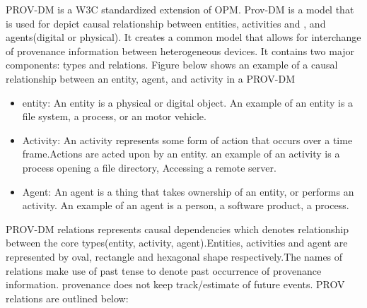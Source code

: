 PROV-DM is a W3C standardized extension of OPM. Prov-DM is a model that is used for depict causal relationship between entities, activities and , and agents(digital or physical).  It creates a common model that allows for interchange of provenance information between heterogeneous devices. It contains two major components: types and relations. Figure below shows an example of a causal relationship between an entity, agent, and activity in a PROV-DM

%
%
\begin{itemize}

\item entity: An entity is a physical or digital object. An example of an entity is a file system, a process, or an motor vehicle.

\item Activity: An activity represents some form of action that occurs over a time frame.Actions are acted upon by an entity. an example of an activity is a process opening a file directory, Accessing a remote server.

\item Agent: An agent is a thing that takes ownership of an entity, or performs an activity. An example of an agent is a person, a software product, a process.
\end{itemize}

PROV-DM relations represents causal dependencies which denotes relationship between the core types(entity, activity, agent).Entities, activities and agent are represented by oval, rectangle and hexagonal shape respectively.The names of relations make use of past tense to denote past occurrence of provenance information. provenance does not keep track/estimate of future events. PROV relations are outlined below:


